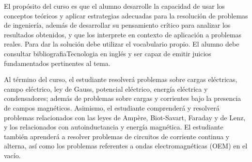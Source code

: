 \begin{syllabus}


\begin{justification}
El propósito del curso es que el alumno desarrolle la capacidad de usar los conceptos teóricos y aplicar estrategias adecuadas para la resolución de problemas de ingeniería, además de desarrollar su pensamiento crítico para analizar los resultados obtenidos, y que los interprete en contexto de aplicación a problemas reales. Para dar la solución debe utilizar el vocabulario propio. El alumno debe consultar bibliografiaTecnologia en inglés y ser capaz de emitir juicios fundamentados pertinentes al tema. 
\end{justification}

\begin{goals}
\item Al término del curso, el estudiante resolverá problemas sobre cargas eléctricas, campo eléctrico, ley de Gauss, potencial eléctrico, energía eléctrica y condensadores; además de problemas sobre cargas y corrientes bajo la presencia de campos magnéticos. Asimismo, el estudiante comprenderá y resolverá problemas relacionados con las leyes de Ampère, Biot-Savart, Faraday y de Lenz, y los relacionados con autoinductancia y energía magnética. El estudiante también aprenderá a resolver problemas de circuitos de corriente continua y alterna, así como los problemas referentes a ondas electromagnéticas (OEM) en el vacío.
\end{goals}

\begin{outcomes}
\item {}
\item {}
\end{outcomes}

\begin{competences}
    \item {}
\end{competences}


\end{syllabus}

